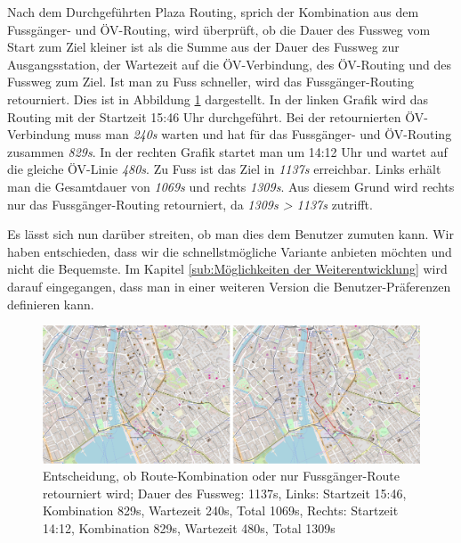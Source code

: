 Nach dem Durchgeführten Plaza Routing, sprich der Kombination aus dem Fussgänger- und ÖV-Routing, wird überprüft, ob die Dauer des Fussweg vom Start zum Ziel kleiner ist als die Summe aus der Dauer des Fussweg zur Ausgangsstation, der Wartezeit auf die ÖV-Verbindung, des ÖV-Routing und des Fussweg zum Ziel. Ist man zu Fuss schneller, wird das Fussgänger-Routing retourniert. Dies ist in Abbildung \ref{fig:qgis_plugin_plaza_route_walking_public_transport_comparison} dargestellt. In der linken Grafik wird das Routing mit der Startzeit 15:46 Uhr durchgeführt. Bei der retournierten ÖV-Verbindung muss man \emph{240s} warten und hat für das Fussgänger- und ÖV-Routing zusammen \emph{829s}.
In der rechten Grafik startet man um 14:12 Uhr und wartet auf die gleiche ÖV-Linie \emph{480s}. Zu Fuss ist das Ziel in \emph{1137s} erreichbar. Links erhält man die Gesamtdauer von \emph{1069s} und rechts \emph{1309s}.
Aus diesem Grund wird rechts nur das Fussgänger-Routing retourniert, da \emph{1309s > 1137s} zutrifft.

Es lässt sich nun darüber streiten, ob man dies dem Benutzer zumuten kann. Wir haben entschieden, dass wir die schnellstmögliche Variante anbieten möchten und nicht die Bequemste.
Im Kapitel \ref{sub:Möglichkeiten der Weiterentwicklung} wird darauf eingegangen, dass man in einer weiteren Version die Benutzer-Präferenzen definieren kann.

\begin{figure}[ht]
    \centering
    \includegraphics[width=1.0\linewidth]{projectdoc/img/qgis_plugin_plaza_route_walking_public_transport_comparison}
    \caption[Entscheidung, ob Route-Kombination oder nur Fussgänger-Route retourniert wird]{Entscheidung, ob Route-Kombination oder nur Fussgänger-Route retourniert wird; Dauer des Fussweg: 1137s, Links: Startzeit 15:46, Kombination 829s, Wartezeit 240s, Total 1069s, Rechts: Startzeit 14:12, Kombination 829s, Wartezeit 480s, Total 1309s}
    \label{fig:qgis_plugin_plaza_route_walking_public_transport_comparison}
\end{figure}

